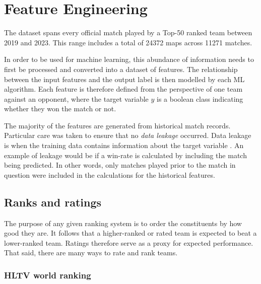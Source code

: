 \clearpage


\section{Feature Engineering}

\newcommand{\mapsTotal}{24372}
\newcommand{\matchesTotal}{11271}
\newcommand{\matchesBoOne}{2234}
\newcommand{\matchesBoThree}{8848}
\newcommand{\matchesBoFive}{142}
\newcommand{\datasetStartDate}{2019}
\newcommand{\datasetEndDate}{2023}

\newcommand{\matchesCSGO}{10843}
\newcommand{\matchesCSTwo}{428}
\newcommand{\matchesLAN}{2225}
\newcommand{\matchesOnline}{9046}


The dataset spans every official match played by a Top-50 ranked team between \datasetStartDate{} and \datasetEndDate{}. This range includes a total of \mapsTotal{} maps across \matchesTotal{} matches.

In order to be used for machine learning, this abundance of information needs to first be processed and converted into a dataset of features. The relationship between the input features and the output label is then modelled by each ML algorithm. Each feature is therefore defined from the perspective of one team against an opponent, where the target variable $y$ is a boolean class indicating whether they won the match or not.

The majority of the features are generated from historical match records. Particular care was taken to ensure that no \textit{data leakage} occurred. Data leakage is when the training data contains information about the target variable \cite{leakage}. An example of leakage would be if a win-rate is calculated by including the match being predicted. In other words, only matches played prior to the match in question were included in the calculations for the historical features.

\subsection{Ranks and ratings}

The purpose of any given ranking system is to order the constituents by how good they are. It follows that a higher-ranked or rated team is expected to beat a lower-ranked team. Ratings therefore serve as a proxy for expected performance. That said, there are many ways to rate and rank teams.

\subsubsection{HLTV world ranking}

